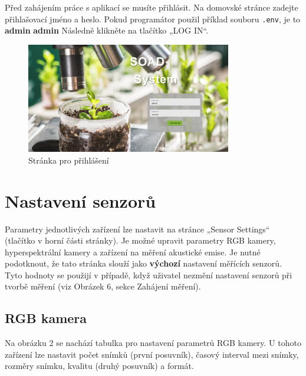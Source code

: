 \documentclass[12pt]{article}
\begin{document}
\begin{teamwork}
        Před zahájením práce s aplikací se musíte přihlásit.
        Na domovské stránce zadejte přihlašovací jméno a heslo.
        Pokud programátor použil příklad souboru \texttt{.env}, je to \textbf{admin} \textbf{admin}
        Následně klikněte na tlačítko „LOG IN“.

        \begin{figure}[hbt!]
            \centering
            \includegraphics[width=0.8\textwidth]{../../img/main_page}
            \caption{Stránka pro přihlášení}
            \label{fig:tlacitko_pro_prih}
        \end{figure}

        \section{Nastavení senzorů}\label{sec:nastaveni-senzoru}

        Parametry jednotlivých zařízení lze nastavit na stránce „Sensor Settings“ (tlačítko v horní části stránky).
        Je možné upravit parametry RGB kamery, hyperspektrální kamery a zařízení na měření akustické emise.
        Je nutné podotknout, že tato stránka slouží jako \textbf{výchozí} nastavení měřících senzorů.
        Tyto hodnoty se použijí v případě, když uživatel nezmění nastavení senzorů při tvorbě měření (viz Obrázek 6, sekce Zahájení měření).

        \subsection{RGB kamera}\label{subsec:rgb-kamera}

        Na obrázku 2 se nachází tabulka pro nastavení parametrů RGB kamery.
        U tohoto zařízení lze nastavit počet snímků (první posuvník), časový interval mezi snímky, rozměry snímku, kvalitu (druhý posuvník) a formát.


\end{teamwork}
\end{document}
